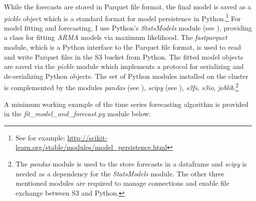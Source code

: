 \documentclass[11pt]{article}
\renewcommand{\cite}{\citet}
\begin{document}
While the forecasts are stored in Parquet file format, the final model is saved as a \emph{pickle} object which is a standard format for model persistence in Python.\footnote{See for example: \url{http://scikit-learn.org/stable/modules/model\_persistence.html}} For model fitting and forecasting, I use Python's \emph{StatsModels} module (see \cite{seabold2010statsmodels}), providing a class for fitting \emph{ARMA} models via maximum likelihood. The \emph{fastparquet} module, which is a Python interface to the Parquet file format, is used to read  and write Parquet files in the S3 bucket from Python. The fitted model objects are saved via the \emph{pickle} module which implements a protocol for serializing and de-serializing Python objects. The set of Python modules installed on the cluster is complemented by the modules \emph{pandas} (see \cite{mckinney-proc-scipy-2010}), \emph{scipy} (see \cite{Jones2001}), \emph{s3fs}, \emph{s3io}, \emph{joblib}.\footnote{The \emph{pandas} module is used to the store forecasts in a dataframe and \emph{scipy} is needed as a dependency for the \emph{StatsModels} module. The other three mentioned modules are required to manage connections and enable file exchange between S3 and Python.}

A minimum working example of the time series forecasting algorithm is provided in the \emph{fit\_model\_and\_forecast.py} module below: 
\end{document}
